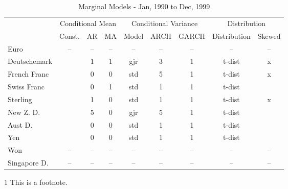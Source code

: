\documentclass[12pt]{article}
\begin{document}
\begin{table}
	\caption{Marginal Models - Jan, 1990 to Dec, 1999}
	\begin{threeparttable}
		\begin{tabular}[l]{l c c c c c c c c}
	    \hline
	& \multicolumn{3}{c}{Conditional Mean}  & \multicolumn{3}{c}{Conditional Variance}  & \multicolumn{2}{c}{Distribution} \\
			            & Const.     & AR & MA & Model & ARCH & GARCH & Distribution & Skewed     \\
	\hline
	    Euro            & --         & -- & -- & --    & --   & --    & --           & --         \\
		Deutschemark    & \checkmark & 1  & 1  & gjr   & 3    & 1     & t-dist       & x          \\
		French Franc    & \checkmark & 0  & 0  & std   & 5    & 1     & t-dist       & x          \\
		Swiss Franc     & \checkmark & 0  & 1  & std   & 1    & 1     & t-dist       & \checkmark \\
		Sterling        & \checkmark & 1  & 0  & std   & 1    & 1     & t-dist       & x          \\
		New Z. D.       & \checkmark & 5  & 0  & gjr   & 5    & 1     & t-dist       & \checkmark \\
		Aust D.         & \checkmark & 0  & 0  & std   & 1    & 1     & t-dist       & \checkmark \\
		Yen             & \checkmark & 0  & 0  & std   & 1    & 1     & t-dist       & \checkmark \\
		Won             & --         & -- & -- & --    & --   & --    & --           & --         \\
		Singapore D.    & --         & -- & -- & --    & --   & --    & --           & --         \\
	\hline
		\end{tabular}
		\begin{tablenotes}
			\item[1]{\footnotesize This is a footnote.}
		\end{tablenotes}
	\end{threeparttable}
\end{table}
\end{document}
